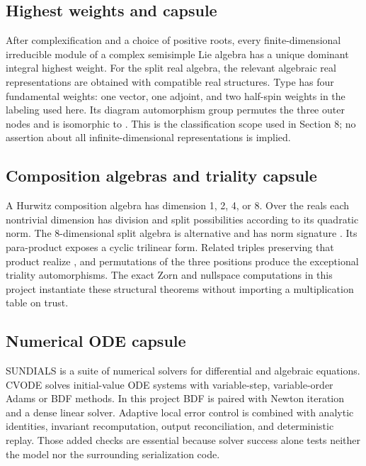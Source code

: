 \documentclass[11pt]{article}
\begin{document}
\subsection{Highest weights and \texttt{} capsule}

After complexification and a choice of positive roots, every finite-dimensional irreducible module of a complex semisimple Lie algebra has a unique dominant integral highest weight. For the split real algebra, the relevant algebraic real representations are obtained with compatible real structures. Type \texttt{} has four fundamental weights: one vector, one adjoint, and two half-spin weights in the labeling used here. Its diagram automorphism group permutes the three outer nodes and is isomorphic to \texttt{}. This is the classification scope used in Section 8; no assertion about all infinite-dimensional representations is implied.

\subsection{Composition algebras and triality capsule}

A Hurwitz composition algebra has dimension 1, 2, 4, or 8. Over the reals each nontrivial dimension has division and split possibilities according to its quadratic norm. The 8-dimensional split algebra is alternative and has norm signature \texttt{}. Its para-product exposes a cyclic trilinear form. Related triples preserving that product realize \texttt{}, and permutations of the three positions produce the exceptional triality automorphisms. The exact Zorn and nullspace computations in this project instantiate these structural theorems without importing a multiplication table on trust.

\subsection{Numerical ODE capsule}

SUNDIALS is a suite of numerical solvers for differential and algebraic equations. CVODE solves initial-value ODE systems with variable-step, variable-order Adams or BDF methods. In this project BDF is paired with Newton iteration and a dense linear solver. Adaptive local error control is combined with analytic identities, invariant recomputation, output reconciliation, and deterministic replay. Those added checks are essential because solver success alone tests neither the model nor the surrounding serialization code.
\end{document}
